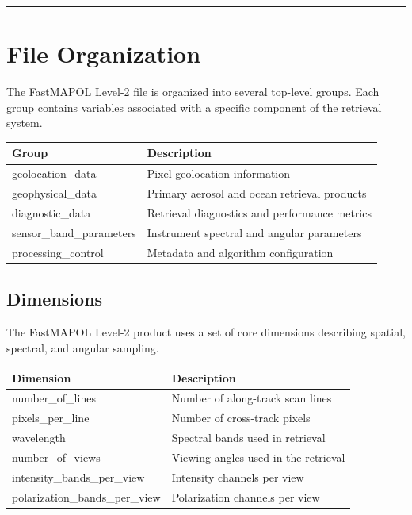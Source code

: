\documentclass[
  letterpaper,
]{scrbook}
\begin{document}
\begin{center}\rule{0.5\linewidth}{0.5pt}\end{center}

\section{File Organization}\label{file-organization}

The FastMAPOL Level-2 file is organized into several top-level groups.
Each group contains variables associated with a specific component of
the retrieval system.

\begin{longtable}[]{@{}ll@{}}
\toprule\noalign{}
Group & Description \\
\midrule\noalign{}
\endhead
\bottomrule\noalign{}
\endlastfoot
geolocation\_data & Pixel geolocation information \\
geophysical\_data & Primary aerosol and ocean retrieval products \\
diagnostic\_data & Retrieval diagnostics and performance metrics \\
sensor\_band\_parameters & Instrument spectral and angular parameters \\
processing\_control & Metadata and algorithm configuration \\
\end{longtable}

\subsection{Dimensions}\label{dimensions}

The FastMAPOL Level-2 product uses a set of core dimensions describing
spatial, spectral, and angular sampling.

\begin{longtable}[]{@{}ll@{}}
\toprule\noalign{}
Dimension & Description \\
\midrule\noalign{}
\endhead
\bottomrule\noalign{}
\endlastfoot
number\_of\_lines & Number of along-track scan lines \\
pixels\_per\_line & Number of cross-track pixels \\
wavelength & Spectral bands used in retrieval \\
number\_of\_views & Viewing angles used in the retrieval \\
intensity\_bands\_per\_view & Intensity channels per view \\
polarization\_bands\_per\_view & Polarization channels per view \\
\end{longtable}
\end{document}
